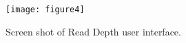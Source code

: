 \documentclass[11pt,fleqn]{book} %
\begin{document}
\begin{figure}[!ht]
    \centering
    \texttt{[image: figure4]}
    \caption{Screen shot of Read Depth user interface.}
    \label{fig:blast_query_screen_shot2}
\end{figure}




\cleardoublepage
{}
\setlength{\columnsep}{0.75cm}
\printindex

\end{document}
